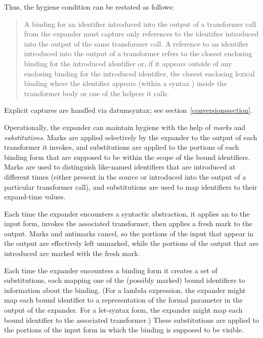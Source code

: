 Thus, the hygiene condition can be restated as follows:

\begin{quotation}
\noindent
A binding for an identifier introduced into the output of a transformer
call from the expander must capture only references to the identifier
introduced into the output of the same transformer call.
A reference to an identifier introduced into the output of a transformer
refers to the closest enclosing binding for the introduced identifier or,
if it appears outside of any enclosing binding for the introduced
identifier, the closest enclosing lexical binding where the identifier
appears (within a {\cf syntax} )
inside the transformer body or one of the helpers it calls.
\end{quotation}

Explicit captures are handled via {\cf datum\coerce{}syntax}; see
section~\ref{conversionssection}.

Operationally, the expander can maintain hygiene with the help of
\emph{marks} and \emph{substitutions}.
Marks are applied selectively by the expander to the output of each
transformer it invokes, and substitutions are applied to the portions
of each binding form that are supposed to be within the scope of the bound
identifiers.
Marks are used to distinguish like-named identifiers that are
introduced at different times (either present in the source or introduced
into the output of a particular transformer call), and substitutions are
used to map identifiers to their expand-time values.

Each time the expander encounters a syntactic abstraction, it applies an
 to the input form, invokes the associated transformer,
then applies a fresh mark to the output.
Marks and antimarks cancel, so the portions of the input that appear in
the output are effectively left unmarked, while the portions of the output
that are introduced are marked with the fresh mark.

Each time the expander encounters a binding form it creates a set of
substitutions, each mapping one of the (possibly marked) bound identifiers
to information about the binding.
(For a {\cf lambda} expression, the expander might map each bound
identifier to a representation of the formal parameter in the output of
the expander.
For a {\cf let-syntax} form, the expander might map each bound
identifier to the associated transformer.)
These substitutions are applied to the portions of the input form in
which the binding is supposed to be visible.

